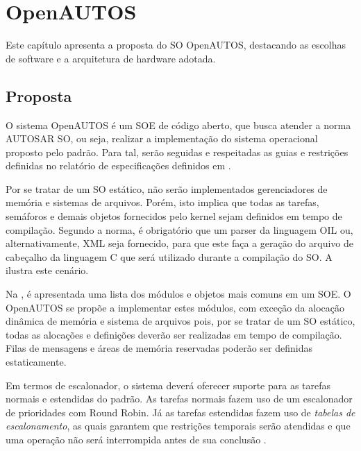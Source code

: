 \chapter{OpenAUTOS}

Este capítulo apresenta a proposta do SO OpenAUTOS, destacando as escolhas de software e a arquitetura de hardware adotada.

\section{Proposta}

O sistema OpenAUTOS é um SOE de código aberto, que busca atender a norma AUTOSAR SO, ou seja, realizar a implementação do sistema operacional proposto pelo padrão. Para tal, serão seguidas e respeitadas as guias e restrições definidas no relatório de especificações definidos em .

Por se tratar de um SO estático, não serão implementados gerenciadores de memória e sistemas de arquivos. Porém, isto implica que todas as tarefas, semáforos e demais objetos fornecidos pelo kernel sejam definidos em tempo de compilação. Segundo a norma, é obrigatório que um parser da linguagem OIL ou, alternativamente, XML seja fornecido, para que este faça a geração do arquivo de cabeçalho da linguagem C que será utilizado durante a compilação do SO. A  ilustra este cenário.


Na , é apresentada uma lista dos módulos e objetos mais comuns em um SOE. O OpenAUTOS se propõe a implementar estes módulos, com exceção da alocação dinâmica de memória e sistema de arquivos pois, por se tratar de um SO estático, todas as alocações e definições deverão ser realizadas em tempo de compilação. Filas de mensagens e áreas de memória reservadas poderão ser definidas estaticamente.


Em termos de escalonador, o sistema deverá oferecer suporte para as tarefas normais e estendidas do padrão. As tarefas normais fazem uso de um escalonador de prioridades com Round Robin. Já as tarefas estendidas fazem uso de \emph{tabelas de escalonamento}, as quais garantem que restrições temporais serão atendidas e que uma operação não será interrompida antes de sua conclusão \cite{AUTOSAR:SOS}.

